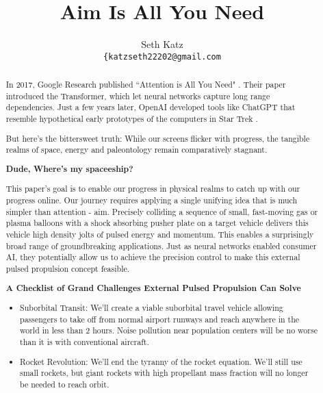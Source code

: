 \documentclass{article}
\title{Aim Is All You Need}
\author{
  Seth Katz \\
  \texttt{\{katzseth22202@gmail.com} \\
}
\begin{document}
\maketitle

\begin{abstract}\label{sec:abstract}
 In 2017, Google Research published ``Attention is All You Need" \cite{vaswani2023attentionneed}.  Their paper introduced the Transformer, which let neural networks capture long range dependencies.   Just a few years later, OpenAI developed tools like ChatGPT \cite{chatgpt} that resemble hypothetical early prototypes of the computers in Star Trek \cite{startrek}.

But here's the bittersweet truth:  While our screens flicker with progress, the tangible realms of space, energy and paleontology remain comparatively stagnant.

\textbf{Dude, Where's my spaceeship?}

This paper's goal is to enable our progress in physical realms to catch up with our progress online.  Our journey requires applying a single unifying idea that is much simpler than attention - aim.   Precisely colliding a sequence of small, fast-moving gas or plasma balloons with a shock absorbing pusher plate on a target vehicle delivers this vehicle high density jolts of pulsed energy and momentum.   This enables a surprisingly broad range of groundbreaking applications.   Just as neural networks enabled consumer AI, they potentially allow us to achieve the precision control to make this external pulsed propulsion concept feasible.

\textbf{A Checklist of Grand Challenges External Pulsed Propulsion Can Solve}
\begin{itemize}
    \item 
Suborbital Transit:  We'll create a viable suborbital travel vehicle allowing passengers to take off from normal airport runways and reach anywhere in the world in less than 2 hours.   Noise pollution near population centers will be no worse than it is with conventional aircraft.
 \item Rocket Revolution: We'll end the tyranny of the rocket equation.   We'll still use small rockets, but giant rockets with high propellant mass fraction will no longer be needed to reach orbit.   
 

\end{itemize}
\end{abstract}
\end{document}
